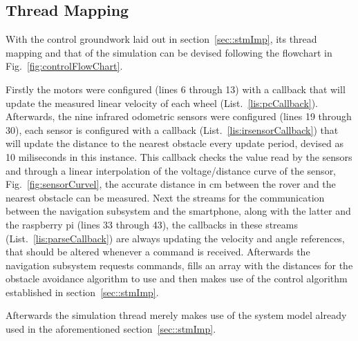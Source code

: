 \subsection{Thread Mapping}
With the control groundwork laid out in section~\ref{sec::stmImp}, its thread mapping and that of the simulation can be devised following the flowchart in Fig.~\ref{fig:controlFlowChart}.
 
Firstly the motors were configured (lines 6 through 13) with a callback that will update the measured linear velocity of each wheel (List.~\ref{lis:pcCallback}). Afterwards, the nine infrared odometric sensors were configured (lines 19 through 30), each sensor is configured with a callback (List.~\ref{lis:irsensorCallback}) that will update the distance to the nearest obstacle every update period, devised as 10 miliseconds in this instance. This callback checks the value read by the sensors and through a linear interpolation of the voltage/distance curve of the sensor, Fig.~\ref{fig:sensorCurvel}, the accurate distance in cm between the rover and the nearest obstacle can be measured. Next the streams for the communication between the navigation subsystem and the smartphone, along with the latter and the raspberry pi (lines 33 through 43), the callbacks in these streams (List.~\ref{lis:parseCallback}) are always updating the velocity and angle references, that should be altered whenever a command is received. Afterwards the navigation subsystem requests commands, fills an array with the distances for the obstacle avoidance algorithm to use and then makes use of the control algorithm established in section~\ref{sec::stmImp}.
 
 
 

Afterwards the simulation thread merely makes use of the system model already used in the aforementioned section~\ref{sec::stmImp}.
 

